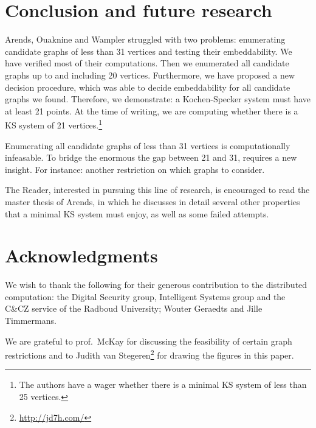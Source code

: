 \documentclass[adraft,copyright,creativecommons]{eptcs}
\theoremstyle{definition}
\theoremstyle{remark}
\begin{document}
\section{Conclusion and future research}
Arends, Ouaknine and Wampler struggled with two problems:
enumerating candidate graphs of less than 31 vertices
and testing their embeddability.
We have verified most of their computations.
Then we enumerated all candidate graphs
up to and including 20 vertices.
Furthermore, we have proposed a new decision procedure,
which was able to decide embeddability
for all candidate graphs we found.
Therefore, we demonstrate: a Kochen-Specker system must have at least
21 points.
At the time of writing,
we are computing
whether there is a KS system of 21 vertices.\footnote{
The authors have a wager whether there is a minimal KS system of less
than 25 vertices.}

Enumerating all candidate graphs of less than 31 vertices
is computationally infeasable.
To bridge the enormous the gap between 21 and 31,
requires a new insight.
For instance: another restriction on which graphs to consider.

The Reader, interested in pursuing this line of research,
is encouraged to read the master thesis\cite{a09} of Arends,
in which he discusses in detail several other
properties that a minimal KS system must enjoy, as well as
some failed attempts.

\section{Acknowledgments}
We wish to thank the following for their generous contribution to the
distributed computation:
    the Digital Security group, Intelligent Systems group
    and the C\&CZ service of the Radboud University;
    Wouter Geraedts and
    Jille Timmermans.

We are grateful to prof.~McKay for discussing
the feasibility of certain graph restrictions and
to Judith van Stegeren\footnote{\url{http://jd7h.com/}}
for drawing the figures in this paper.

\clearpage
\appendix
\end{document}
